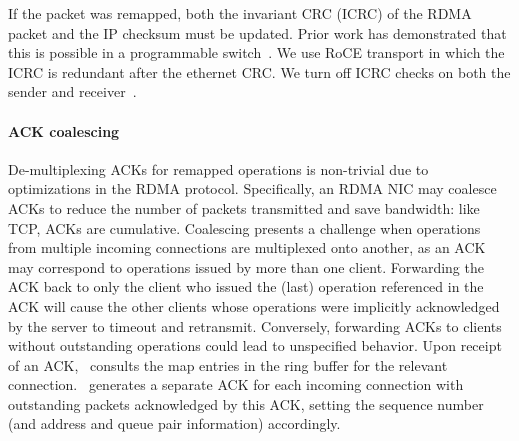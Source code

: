 If the packet was remapped, both the 
invariant CRC (ICRC) of the RDMA packet and the IP checksum must
be updated. Prior work has demonstrated that this is
possible in a programmable switch~. We use RoCE
transport in which the ICRC is redundant after the ethernet
CRC. We turn off ICRC checks on both the sender and
receiver~\cite{switchml}.


\paragraph{ACK coalescing}
De-multiplexing ACKs for remapped operations is non-trivial due to
optimizations in the RDMA protocol. Specifically, an RDMA NIC may
coalesce ACKs to reduce the number of packets transmitted and save
bandwidth: like TCP, ACKs are cumulative. Coalescing presents a
challenge when operations from multiple incoming connections are
multiplexed onto another, as an ACK may correspond to operations
issued by more than one client.  Forwarding the ACK back to only the
client who issued the (last) operation referenced in the ACK will
cause the other clients whose operations were implicitly acknowledged
by the server to timeout and retransmit.  Conversely, forwarding ACKs
to clients without outstanding operations could lead to unspecified
behavior.
%
Upon receipt of an ACK, \sword\ consults the map entries in the ring
buffer for the relevant connection.  \sword\ generates a separate ACK
for each incoming connection with outstanding packets acknowledged by
this ACK, setting the sequence number (and address and queue pair
information) accordingly.


